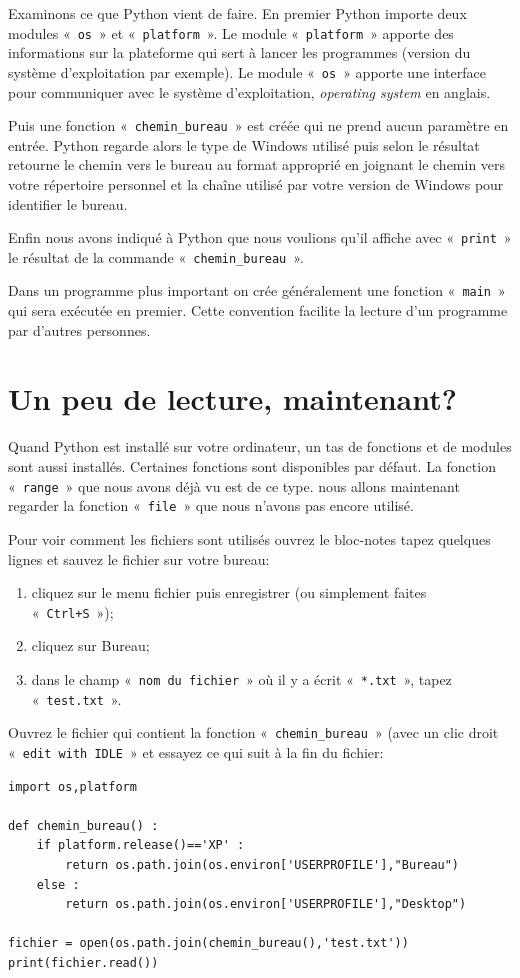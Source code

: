 Examinons ce que Python vient de faire. En premier Python importe deux modules «~\texttt{os}~» et «~\texttt{platform}~». Le module «~\texttt{platform}~» apporte des informations sur la plateforme qui sert à lancer les programmes (version du système d'exploitation par exemple). Le module «~\texttt{os}~» apporte une interface pour communiquer avec le système d'exploitation, \emph{operating system} en anglais.

Puis une fonction «~\texttt{chemin\_bureau}~» est créée qui ne prend aucun paramètre en entrée. Python regarde alors le type de Windows utilisé puis selon le résultat retourne le chemin vers le bureau au format approprié en joignant le chemin vers votre répertoire personnel et la chaîne utilisé par votre version de Windows pour identifier le bureau.

Enfin nous avons indiqué à Python que nous voulions qu'il affiche avec «~\texttt{print}~» le résultat de la commande «~\texttt{chemin\_bureau}~».

Dans un programme plus important on crée généralement une fonction «~\texttt{main}~» qui sera exécutée en premier. Cette convention facilite la lecture d'un programme par d'autres personnes.

\section{Un peu de lecture, maintenant?}
Quand Python est installé sur votre ordinateur, un tas de fonctions et de modules sont aussi installés. Certaines fonctions sont disponibles par défaut. La fonction «~\texttt{range}~» que nous avons déjà vu est de ce type. nous allons maintenant regarder la fonction «~\texttt{file}~» que nous n'avons pas encore utilisé.

Pour voir comment les fichiers sont utilisés ouvrez le bloc-notes  tapez quelques lignes et sauvez le fichier sur votre bureau:
\begin{enumerate}
\item cliquez sur le menu fichier puis enregistrer (ou simplement faites «~\texttt{Ctrl+S}~»);
\item cliquez sur Bureau;
\item dans le champ «~\texttt{nom du fichier}~» où il y a écrit «~\texttt{*.txt}~», tapez «~\texttt{test.txt}~».
\end{enumerate}

Ouvrez le fichier qui contient la fonction «~\texttt{chemin\_bureau}~» (avec un clic droit «~\texttt{edit with IDLE}~» et essayez ce qui suit à la fin du fichier:
\begin{Verbatim}[frame=single,rulecolor=\color{mbleu}, label=à taper]
import os,platform

def chemin_bureau() :
    if platform.release()=='XP' :
        return os.path.join(os.environ['USERPROFILE'],"Bureau")
    else :
        return os.path.join(os.environ['USERPROFILE'],"Desktop")
    
fichier = open(os.path.join(chemin_bureau(),'test.txt'))
print(fichier.read())
\end{Verbatim}

